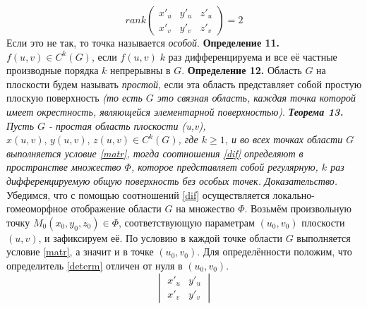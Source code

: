 \documentclass[12pt,a4paper]{article}
\begin{document}
	\begin{equation}\label{matr}
	rank
	\begin{pmatrix}
	x'_{u} & y'_{u} & z'_{u}\\
	x'_{v} & y'_{v} & z'_{v}
	\end{pmatrix}
	= 2
	\end{equation}
	\newline
	Если это не так, то точка называется \textit{особой}.
	\newline
	\newline
	\textbf{Определение 11.} $f(u,v) \in C^{k}(G)$, если $f(u,v)\; k$ раз дифференцируема и все её частные производные порядка $k$  непрерывны в $G$.
	\newline
	\newline
	\textbf{Определение 12.} Область $G$ на плоскости будем называть \textit{простой}, если эта область представляет собой простую плоскую поверхность \textit{(то есть $G$ это связная область, каждая точка которой имеет окрестность, являющейся элементарной поверхностью)}.
	\newline
	\newline
	\textit{\textbf{Теорема 13.} Пусть $G$ - простая область плоскости (u,v), $x(u,v),\, y(u,v),\, z(u,v) \in C^{k}(G)$, где $k \geq 1$, и во всех точках области $G$ выполняется условие \eqref{matr}, тогда соотношения \eqref{dif} определяют в пространстве множество $\Phi$, которое представляет собой регулярную, $k$ раз дифференцируемую общую поверхность без особых точек.}
	\newline
	\newline
	\textit{Доказательство.}
	\newline
	Убедимся, что с помощью соотношений \eqref{dif} осуществляется локально-гомеоморфное отображение области $G$ на множество $\Phi$.
	\newline
	Возьмём произвольную точку $M_{0}(x_{0}, y_{0}, z_{0}) \in \Phi$, соответствующую параметрам $(u_{0}, v_{0})$ плоскости $(u,v)$, и зафиксируем её. По условию в каждой точке области $G$ выполняется условие \eqref{matr}, а значит и в точке $(u_{0}, v_{0})$. Для определённости положим, что определитель \eqref{determ} отличен от нуля в $(u_{0}, v_{0})$.
	\newline
	\begin{equation}\label{determ}
		\begin{vmatrix}
			x'_{u} & y'_{u}\\
			x'_{v} & y'_{v}
		\end{vmatrix}
	\end{equation}
\end{document}
